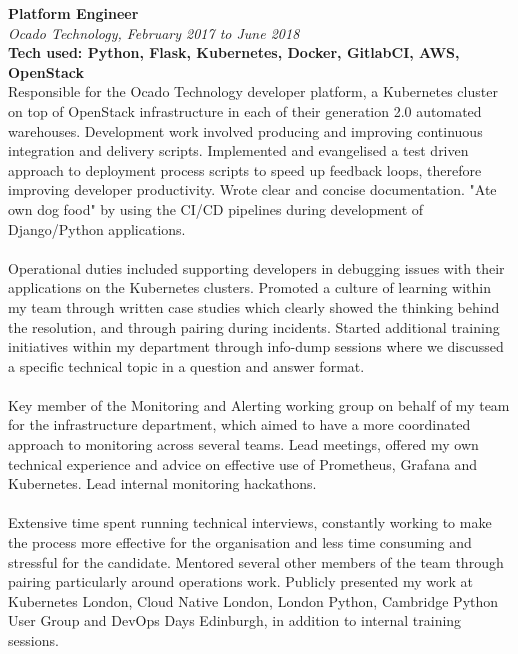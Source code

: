 \documentclass{article}
\begin{document}
\begin{flushleft}
\textbf{Platform Engineer}\\
\textit{Ocado Technology, February 2017 to June 2018}\\
\textbf{Tech used: Python, Flask, Kubernetes, Docker, GitlabCI, AWS, OpenStack}\\[5pt]
Responsible for the Ocado Technology developer platform, a Kubernetes cluster on top of OpenStack infrastructure in each of their generation 2.0 automated warehouses. Development work involved producing and improving continuous integration and delivery scripts. Implemented and evangelised a test driven approach to deployment process scripts to speed up feedback loops, therefore improving developer productivity. Wrote clear and concise documentation. "Ate own dog food" by using the CI/CD pipelines during development of Django/Python applications.

\paragraph{}Operational duties included supporting developers in debugging issues with their applications on the Kubernetes clusters. Promoted a culture of learning within my team through written case studies which clearly showed the thinking behind the resolution, and through pairing during incidents. Started additional training initiatives within my department through info-dump sessions where we discussed a specific technical topic in a question and answer format.

\paragraph{}Key member of the Monitoring and Alerting working group on behalf of my team for the infrastructure department, which aimed to have a more coordinated approach to monitoring across several teams. Lead meetings, offered my own technical experience and advice on effective use of Prometheus, Grafana and Kubernetes. Lead internal monitoring hackathons.

\paragraph{}Extensive time spent running technical interviews, constantly working to make the process more effective for the organisation and less time consuming and stressful for the candidate. Mentored several other members of the team through pairing particularly around operations work. Publicly presented my work at Kubernetes London, Cloud Native London, London Python, Cambridge Python User Group and DevOps Days Edinburgh, in addition to internal training sessions.\\[10pt]


\end{flushleft}
\end{document}
